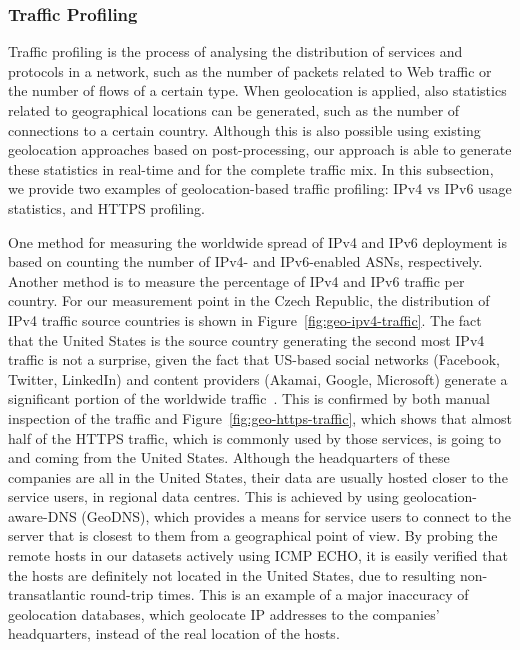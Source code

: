 \subsubsection{Traffic Profiling}

Traffic profiling is the process of analysing the distribution of services and protocols in a network, such as the number of packets related to Web traffic or the number of flows of a certain type. When geolocation is applied, also statistics related to geographical locations can be generated, such as the number of connections to a certain country. Although this is also possible using existing geolocation approaches based on post-processing, our approach is able to generate these statistics in real-time and for the complete traffic mix. In this subsection, we provide two examples of geolocation-based traffic profiling: IPv4 vs IPv6 usage statistics, and HTTPS profiling.

One method for measuring the worldwide spread of IPv4 and IPv6 deployment is based on counting the number of IPv4- and IPv6-enabled ASNs, respectively. Another method is to measure the percentage of IPv4 and IPv6 traffic per country. For our measurement point in the Czech Republic, the distribution of IPv4 traffic source countries is shown in Figure~\ref{fig:geo-ipv4-traffic}. The fact that the United States is the source country generating the second most IPv4 traffic is not a surprise, given the fact that US-based social networks (Facebook, Twitter, LinkedIn) and content providers (Akamai, Google, Microsoft) generate a significant portion of the worldwide traffic~\cite{Gehlen-2012-Uncovering}. This is confirmed by both manual inspection of the traffic and Figure~\ref{fig:geo-https-traffic}, which shows that almost half of the HTTPS traffic, which is commonly used by those services, is going to and coming from the United States. Although the headquarters of these companies are all in the United States, their data are usually hosted closer to the service users, in regional data centres. This is achieved by using geolocation-aware-DNS (GeoDNS), which provides a means for service users to connect to the server that is closest to them from a geographical point of view. By probing the remote hosts in our datasets actively using ICMP ECHO, it is easily verified that the hosts are definitely not located in the United States, due to resulting non-transatlantic round-trip times. This is an example of a major inaccuracy of geolocation databases, which geolocate IP addresses to the companies' headquarters, instead of the real location of the hosts.

